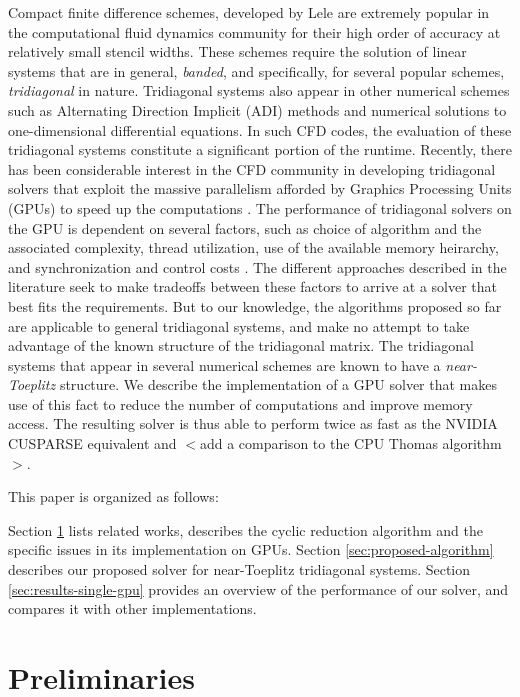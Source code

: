 \documentclass{elsarticle}
\begin{document}
Compact finite difference schemes, developed by
Lele\cite{lele1992compact} 
are extremely popular in the computational fluid dynamics community
for their high order of accuracy at relatively small stencil widths.
These schemes require the solution of
linear systems that are
in general, \emph{banded}, and specifically,
for several popular schemes, \emph{tridiagonal} in nature.
Tridiagonal systems also appear in other numerical schemes
such as
Alternating Direction Implicit (ADI) methods
\cite{1955ADI}
and numerical solutions to one-dimensional differential equations.
In such CFD codes,
the evaluation of these tridiagonal systems constitute
a significant portion of the runtime.
Recently, there has been considerable interest in
the CFD community
in developing tridiagonal solvers
that exploit the massive parallelism afforded by
Graphics Processing Units (GPUs)
to speed up the computations
\cite{tutkun2012gpu}
\cite{esfahanian2014efficient}
\cite{GoSt11CR}.
The performance of tridiagonal solvers on the GPU is
dependent on several factors,
such as
choice of algorithm and the associated complexity,
thread utilization,
use of the available memory heirarchy,
and synchronization and control costs
\cite{Zhang2010FTS}.
The different approaches described in the literature
seek to make tradeoffs between these factors
to arrive at a solver that best fits the requirements.
But to our knowledge, the algorithms proposed so far
are applicable to general tridiagonal systems,
and make no attempt to take advantage of the known structure
of the tridiagonal matrix.
The tridiagonal systems that appear in several numerical schemes
are known to have a \emph{near-Toeplitz} structure.
We describe the implementation of a GPU solver that
makes use of this fact to
reduce the number of computations and
improve memory access.
The resulting solver is thus able to perform twice as fast as
the NVIDIA CUSPARSE equivalent
and $<$add a comparison to the CPU Thomas algorithm$>$.

This paper is organized as follows:

Section \ref{sec:preliminaries}
lists related works,
describes the cyclic reduction algorithm
and the specific issues in its implementation on GPUs.
Section \ref{sec:proposed-algorithm}
describes our proposed solver for near-Toeplitz tridiagonal systems.
Section \ref{sec:results-single-gpu}
provides an overview of the performance of our solver,
and compares it with other implementations.

\section{Preliminaries} \label{sec:preliminaries}
\end{document}
